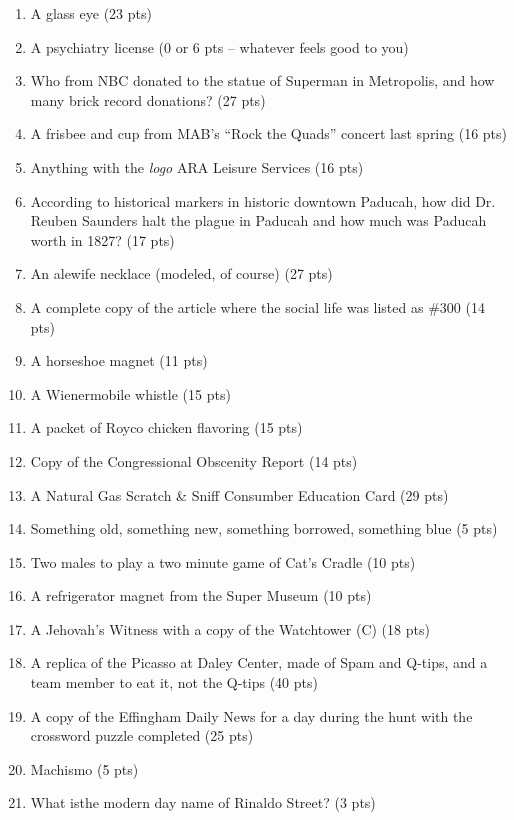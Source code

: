\begin{enumerate}
\item A glass eye (23 pts)
\item A psychiatry license (0 or 6 pts -- whatever feels good to you)
\item Who from NBC donated to the statue of Superman in Metropolis, and how many brick record donations? (27 pts)
\item A frisbee and cup from MAB's ``Rock the Quads'' concert last spring (16 pts)
\item Anything with the {\it logo} ARA Leisure Services (16 pts)
\item According to historical markers in historic downtown Paducah, how did Dr. Reuben Saunders halt the plague in Paducah and how much was Paducah worth in 1827? (17 pts)
\item An alewife necklace (modeled, of course) (27 pts)
\item A complete copy of the article where the {\UofC} social life was listed as \#300 (14 pts)
\item A horseshoe magnet (11 pts)
\item A Wienermobile{\texttrademark} whistle (15 pts)
\item A packet of Royco chicken flavoring (15 pts)
\item Copy of the Congressional Obscenity Report (14 pts)
\item A Natural Gas Scratch \& Sniff Consumber Education Card (29 pts)
\item Something old, something new, something borrowed, something blue (5 pts)
\item Two males to play a two minute game of Cat's Cradle (10 pts)
\item A refrigerator magnet from the Super Museum (10 pts)
\item A Jehovah's Witness with a copy of the Watchtower (C) (18 pts)
\item A replica of the Picasso at Daley Center, made of Spam{\texttrademark} and Q-tips{\texttrademark}, and a team member to eat it, not the Q-tips{\texttrademark} (40 pts)
\item A copy of the Effingham Daily News for a day during the hunt with the crossword puzzle completed (25 pts)
\item Machismo (5 pts)
\item What isthe modern day name of Rinaldo Street? (3 pts)


\end{enumerate}
